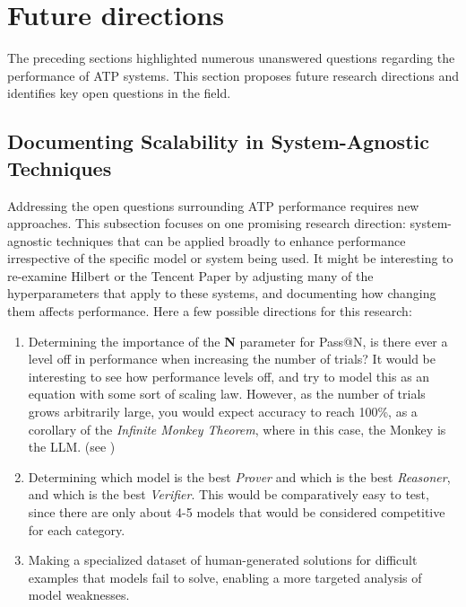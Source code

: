 \documentclass[12pt, letterpaper]{article}
\begin{document}
\section{Future directions}
\label{sec:futures}

The preceding sections highlighted numerous unanswered questions regarding the performance of ATP systems. This section proposes future research directions and identifies key open questions in the field.

\subsection{Documenting Scalability in System-Agnostic Techniques}


Addressing the open questions surrounding ATP performance requires new approaches. This subsection focuses on one promising research direction: system-agnostic techniques that can be applied broadly to enhance performance irrespective of the specific model or system being used. It might be interesting to re-examine Hilbert \citep{varambally2025hilbertrecursivelybuildingformal} or the Tencent Paper \citep{zhou2025solvingformalmathproblems} by adjusting many of the hyperparameters that apply to these systems, and documenting how changing them affects performance. Here a few possible directions for this research:
\begin{enumerate}
    \item Determining the importance of the \textbf{N} parameter for Pass@N, is there ever a level off in performance when increasing the number of trials? It would be interesting to see how performance levels off, and try to model this as an equation with some sort of scaling law. However, as the number of trials grows arbitrarily large, you would expect accuracy to reach 100\%, as a corollary of the \textit{Infinite Monkey Theorem}, where in this case, the Monkey is the LLM. (see \citet{brown2024largelanguagemonkeysscaling})
    \item Determining which model is the best \textit{Prover} and which is the best \textit{Reasoner}, and which is the best \textit{Verifier}. This would be comparatively easy to test, since there are only about 4-5 models that would be considered competitive for each category.
    \item Making a specialized dataset of human-generated solutions for difficult examples that models fail to solve, enabling a more targeted analysis of model weaknesses.
\end{enumerate}
\end{document}
